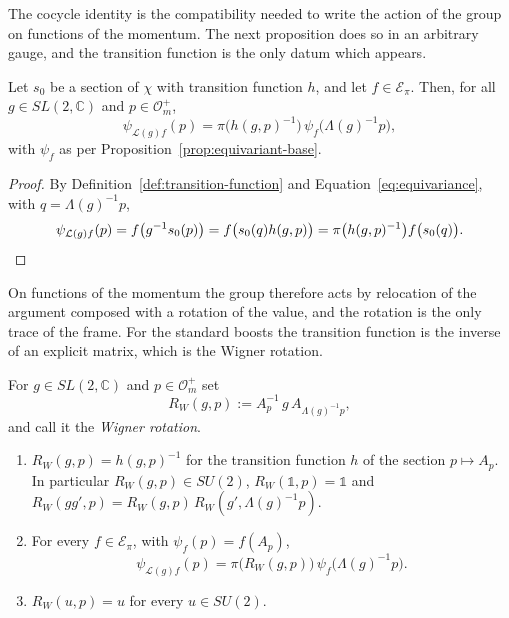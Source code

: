 The cocycle identity is the compatibility needed to write the action of the group on functions of the momentum. The next proposition does so in an arbitrary gauge, and the transition function is the only datum which appears.

\begin{proposition}\label{prop:action-trivialization}
	Let $s_0$ be a section of $\chi$ with transition function $h$, and let $f\in\mathcal{E}_\pi$. Then, for all $g\in SL(2,\mathbb{C})$ and $p\in\mathcal{O}_m^+$,
	\begin{equation*}
		\psi_{\mathcal{L}(g)f}(p)=\pi\big(h(g,p)^{-1}\big)\,\psi_f\big(\Lambda(g)^{-1}p\big),
	\end{equation*}
	with $\psi_f$ as per Proposition~\ref{prop:equivariant-base}.
\end{proposition}

\begin{proof}
	By Definition~\ref{def:transition-function} and Equation~\eqref{eq:equivariance}, with $q=\Lambda(g)^{-1}p$,
	\begin{equation*}
		\psi_{\mathcal{L}(g)f}(p)=f\big(g^{-1}s_0(p)\big)=f\big(s_0(q)h(g,p)\big)=\pi\big(h(g,p)^{-1}\big)f\big(s_0(q)\big).\qedhere
	\end{equation*}
\end{proof}

On functions of the momentum the group therefore acts by relocation of the argument composed with a rotation of the value, and the rotation is the only trace of the frame. For the standard boosts the transition function is the inverse of an explicit matrix, which is the Wigner rotation.

\begin{proposition}\label{prop:induced-action}
	For $g\in SL(2,\mathbb{C})$ and $p\in\mathcal{O}_m^+$ set
	\begin{equation}\label{eq:wigner-rotation}
		R_W(g,p):=A_p^{-1}\,g\,A_{\Lambda(g)^{-1}p},
	\end{equation}
	and call it the \emph{Wigner rotation}.
	\begin{enumerate}
		\item $R_W(g,p)=h(g,p)^{-1}$ for the transition function $h$ of the section $p\mapsto A_p$. In particular $R_W(g,p)\in SU(2)$, $R_W(\mathbb{1},p)=\mathbb{1}$ and $R_W(gg',p)=R_W(g,p)\,R_W(g',\Lambda(g)^{-1}p)$.
		\item For every $f\in\mathcal{E}_\pi$, with $\psi_f(p)=f(A_p)$,
		\begin{equation}\label{eq:induced-action}
			\psi_{\mathcal{L}(g)f}(p)=\pi\big(R_W(g,p)\big)\,\psi_f\big(\Lambda(g)^{-1}p\big).
		\end{equation}
		\item $R_W(u,p)=u$ for every $u\in SU(2)$.
	\end{enumerate}
\end{proposition}

